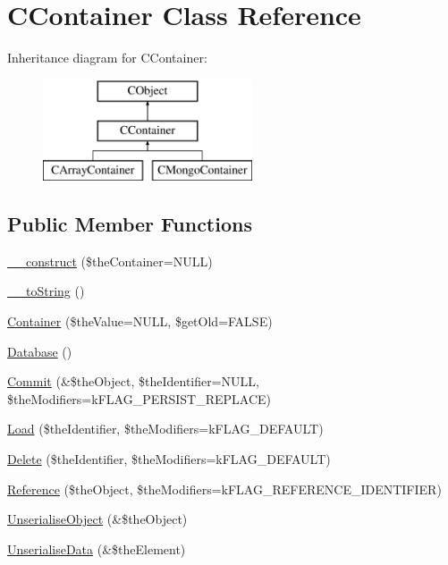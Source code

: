 \hypertarget{class_c_container}{\section{C\-Container Class Reference}
\label{class_c_container}
}
Inheritance diagram for C\-Container\-:\begin{figure}[H]
\begin{center}
\leavevmode
\includegraphics[height=3.000000cm]{class_c_container}
\end{center}
\end{figure}
\subsection*{Public Member Functions}
\begin{DoxyCompactItemize}
\item 
\hyperlink{class_c_container_af2fc42b4d7b5f71e0f127c941440b1aa}{\-\_\-\-\_\-construct} (\$the\-Container=N\-U\-L\-L)
\item 
\hyperlink{class_c_container_aa1d6ed5052f55cdffcf6445968f203ed}{\-\_\-\-\_\-to\-String} ()
\item 
\hyperlink{class_c_container_a7d10fa70dfa381cb95e66c265e2ca113}{Container} (\$the\-Value=N\-U\-L\-L, \$get\-Old=F\-A\-L\-S\-E)
\item 
\hyperlink{class_c_container_a0d691b62d9b70b924e24a332931ce9d1}{Database} ()
\item 
\hyperlink{class_c_container_a4847dc676d1f7704e75f8981e927508a}{Commit} (\&\$the\-Object, \$the\-Identifier=N\-U\-L\-L, \$the\-Modifiers=k\-F\-L\-A\-G\-\_\-\-P\-E\-R\-S\-I\-S\-T\-\_\-\-R\-E\-P\-L\-A\-C\-E)
\item 
\hyperlink{class_c_container_a48db96aa6bbf15d0bfc15725616b7154}{Load} (\$the\-Identifier, \$the\-Modifiers=k\-F\-L\-A\-G\-\_\-\-D\-E\-F\-A\-U\-L\-T)
\item 
\hyperlink{class_c_container_aa91ec2f4624a2ebfb74668f274139329}{Delete} (\$the\-Identifier, \$the\-Modifiers=k\-F\-L\-A\-G\-\_\-\-D\-E\-F\-A\-U\-L\-T)
\item 
\hyperlink{class_c_container_a1486a3cb34d24ff1c3028ad4360b5dc6}{Reference} (\$the\-Object, \$the\-Modifiers=k\-F\-L\-A\-G\-\_\-\-R\-E\-F\-E\-R\-E\-N\-C\-E\-\_\-\-I\-D\-E\-N\-T\-I\-F\-I\-E\-R)
\item 
\hyperlink{class_c_container_aa339d3c4c9b011713176a89fe9c7783d}{Unserialise\-Object} (\&\$the\-Object)
\item 
\hyperlink{class_c_container_a09d585e2a9809221a42d52d7520c9cbf}{Unserialise\-Data} (\&\$the\-Element)
\end{DoxyCompactItemize}
